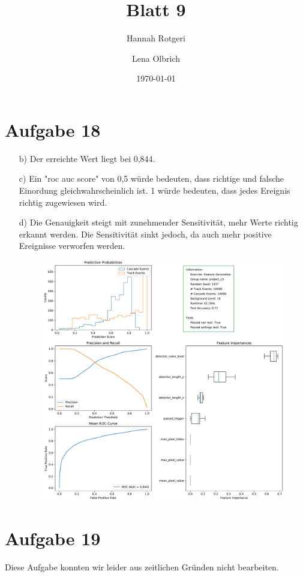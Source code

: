 \documentclass[11pt,a4paper]{article}
\title{Blatt 9}
\date{\today}
\author{Hannah Rotgeri \and Lena Olbrich}
\begin{document}
	\maketitle

	\section{Aufgabe 18}


	\begin{itemize}
		\item[b)]
			Der erreichte Wert liegt bei 0,844.

		\item[c)]
			 Ein "roc auc score" von 0,5 würde bedeuten, dass richtige und falsche Einordung gleichwahrscheinlich ist.
			 1 würde bedeuten, dass jedes Ereignis richtig zugewiesen wird.

		\item[d)]
			 Die Genauigkeit steigt mit zunehmender Sensitivität,
			 mehr Werte richtig erkannt werden.
			 Die Sensitivität sinkt jedoch, da auch mehr positive Ereignisse verworfen werden.

			\begin{figure}[H]
				\centering
				\includegraphics[width=\textwidth]{feature_generation.pdf}
			\end{figure}

	\end{itemize}

	\section{Aufgabe 19}
	Diese Aufgabe konnten wir leider aus zeitlichen Gründen nicht bearbeiten.
\end{document}
